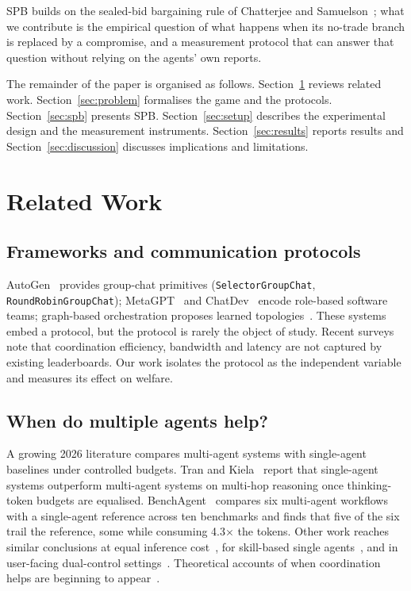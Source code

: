 \documentclass[11pt]{article}
\begin{document}
SPB builds on the sealed-bid bargaining rule of Chatterjee and Samuelson~\cite{chatterjee1983}; what we contribute is the empirical question of what happens when its no-trade branch is replaced by a compromise, and a measurement protocol that can answer that question without relying on the agents' own reports.

The remainder of the paper is organised as follows. Section~\ref{sec:related} reviews related work. Section~\ref{sec:problem} formalises the game and the protocols. Section~\ref{sec:spb} presents SPB. Section~\ref{sec:setup} describes the experimental design and the measurement instruments. Section~\ref{sec:results} reports results and Section~\ref{sec:discussion} discusses implications and limitations.

\section{Related Work}
\label{sec:related}

\subsection{Frameworks and communication protocols}

AutoGen~\cite{autogen} provides group-chat primitives (\texttt{SelectorGroupChat}, \texttt{RoundRobinGroupChat}); MetaGPT~\cite{metagpt} and ChatDev~\cite{chatdev} encode role-based software teams; graph-based orchestration proposes learned topologies~\cite{gdesigner}. These systems embed a protocol, but the protocol is rarely the object of study. Recent surveys~\cite{beyondselftalk,protocoltax} note that coordination efficiency, bandwidth and latency are not captured by existing leaderboards. Our work isolates the protocol as the independent variable and measures its effect on welfare.

\subsection{When do multiple agents help?}

A growing 2026 literature compares multi-agent systems with single-agent baselines under controlled budgets. Tran and Kiela~\cite{equalbudget} report that single-agent systems outperform multi-agent systems on multi-hop reasoning once thinking-token budgets are equalised. BenchAgent~\cite{benchagent} compares six multi-agent workflows with a single-agent reference across ten benchmarks and finds that five of the six trail the reference, some while consuming 4.3$\times$ the tokens. Other work reaches similar conclusions at equal inference cost~\cite{equalinference}, for skill-based single agents~\cite{skillsreplace}, and in user-facing dual-control settings~\cite{dualcontrol}. Theoretical accounts of when coordination helps are beginning to appear~\cite{taxmodel,infobottleneck}.
\end{document}
